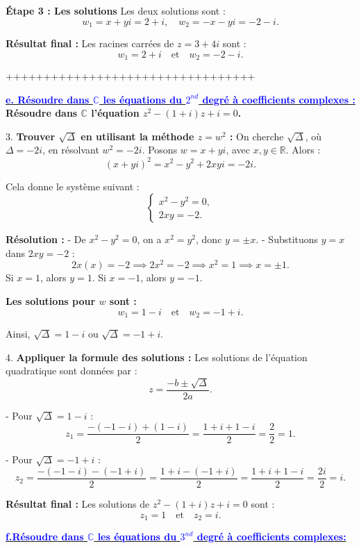 \documentclass[12pt]{article}
\begin{document}
\textbf{Étape 3 : Les solutions}  
Les deux solutions sont :
\[
w_1 = x + yi = 2 + i, \quad w_2 = -x - yi = -2 - i.
\]

\textbf{Résultat final :}  
Les racines carrées de \( z = 3 + 4i \) sont :
\[
w_1 = 2 + i \quad \text{et} \quad w_2 = -2 - i.
\]

+++++++++++++++++++++++++++++++++

\underline{\textbf{\textcolor{blue}{e. Résoudre dans $\mathbb{C}$ les équations du $2^{nd}$ degré à coefficients complexes :}}}\\
\textbf{Résoudre dans \( \mathbb{C} \) l’équation \( z^2 - (1 + i)z + i = 0 \).}

3. \textbf{Trouver \( \sqrt{\Delta} \) en utilisant la méthode \( z = w^2 \) :}  
On cherche \( \sqrt{\Delta} \), où \( \Delta = -2i \), en résolvant \( w^2 = -2i \).  
Posons \( w = x + yi \), avec \( x, y \in \mathbb{R} \). Alors :
\[
(x + yi)^2 = x^2 - y^2 + 2xyi = -2i.
\]

Cela donne le système suivant :
\[
\begin{cases}
x^2 - y^2 = 0, \\
2xy = -2.
\end{cases}
\]

\textbf{Résolution :}
- De \( x^2 - y^2 = 0 \), on a \( x^2 = y^2 \), donc \( y = \pm x \).
- Substituons \( y = x \) dans \( 2xy = -2 \) :
  \[
  2x(x) = -2 \implies 2x^2 = -2 \implies x^2 = 1 \implies x = \pm 1.
  \]
  Si \( x = 1 \), alors \( y = 1 \).  
  Si \( x = -1 \), alors \( y = -1 \).

\textbf{Les solutions pour \( w \) sont :}
\[
w_1 = 1 - i \quad \text{et} \quad w_2 = -1 + i.
\]

Ainsi, \( \sqrt{\Delta} = 1 - i \) ou \( \sqrt{\Delta} = -1 + i \).

4. \textbf{Appliquer la formule des solutions :}  
Les solutions de l’équation quadratique sont données par :
\[
z = \frac{-b \pm \sqrt{\Delta}}{2a}.
\]

- Pour \( \sqrt{\Delta} = 1 - i \) :
  \[
  z_1 = \frac{-(-1 - i) + (1 - i)}{2} = \frac{1 + i + 1 - i}{2} = \frac{2}{2} = 1.
  \]

- Pour \( \sqrt{\Delta} = -1 + i \) :
  \[
  z_2 = \frac{-(-1 - i) - (-1 + i)}{2} = \frac{1 + i - (-1 + i)}{2} = \frac{1 + i + 1 - i}{2} = \frac{2i}{2} = i.
  \]

\textbf{Résultat final :}  
Les solutions de \( z^2 - (1 + i)z + i = 0 \) sont :
\[
z_1 = 1 \quad \text{et} \quad z_2 = i.
\]


\underline{\textbf{\textcolor{blue}{f.Résoudre dans $\mathbb{C}$ les équations du $3^{nd}$ degré à coefficients complexes:}}}\\
\end{document}
